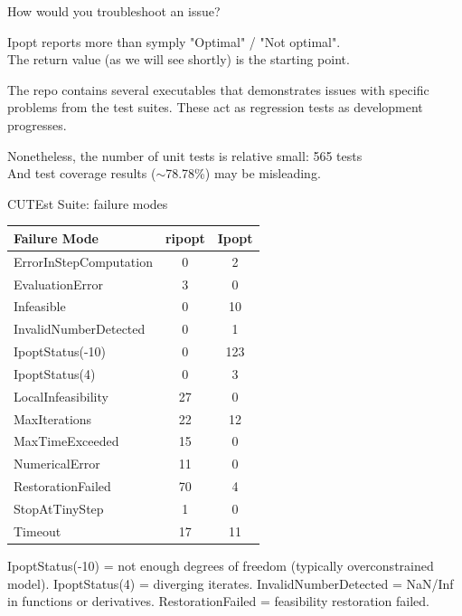 \documentclass{beamer}
\begin{document}
\begin{frame}{How would you troubleshoot an issue?}

  Ipopt reports more than symply "Optimal" / "Not optimal". \\
  The return value (as we will see shortly) is the starting point.

  \vfill

  The repo contains several executables that demonstrates issues with specific problems from the test suites.
  These act as regression tests as development progresses.

  \vfill

  Nonetheless, the number of unit tests is relative small: 565 tests \\
  And test coverage results ($\sim$78.78\%) may be misleading.

\end{frame}

\begin{frame}{CUTEst Suite: failure modes}
  \centering
  \footnotesize
  \begin{tabular}{@{}>{\raggedright\arraybackslash}p{}cc@{}}
    \toprule
    Failure Mode           & ripopt & Ipopt \\
    \midrule
    ErrorInStepComputation & 0      & 2     \\
    EvaluationError        & 3      & 0     \\
    Infeasible             & 0      & 10    \\
    InvalidNumberDetected  & 0      & 1     \\
    IpoptStatus(-10)       & 0      & 123   \\
    IpoptStatus(4)         & 0      & 3     \\
    LocalInfeasibility     & 27     & 0     \\
    MaxIterations          & 22     & 12    \\
    MaxTimeExceeded        & 15     & 0     \\
    NumericalError         & 11     & 0     \\
    RestorationFailed      & 70     & 4     \\
    StopAtTinyStep         & 1      & 0     \\
    Timeout                & 17     & 11    \\
    \bottomrule
  \end{tabular}

  \vspace{1em}

  \tiny
  IpoptStatus(-10) = not enough degrees of freedom (typically overconstrained model). IpoptStatus(4) = diverging iterates. InvalidNumberDetected = NaN/Inf in functions or derivatives. RestorationFailed = feasibility restoration failed.

\end{frame}
\end{document}
